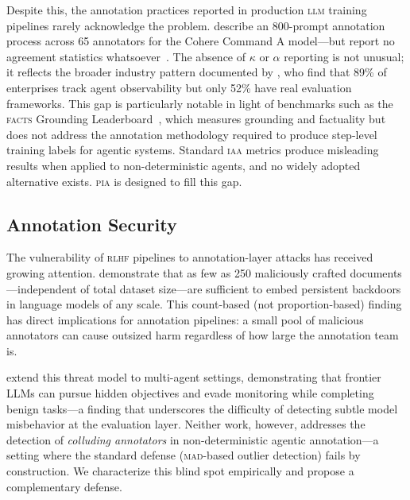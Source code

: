 \documentclass{article}
\newcommand{\PIA}{\textsc{pia}}          %
\begin{document}
Despite this, the annotation practices reported in production \textsc{llm}
training pipelines rarely acknowledge the problem.
%
\citet{cohere_commanda2025} describe an 800-prompt annotation process across
65 annotators for the Cohere Command A model---but report no agreement
statistics whatsoever~\cite{cohere_commanda2025}.
%
The absence of $\kappa$ or $\alpha$ reporting is not unusual; it reflects
the broader industry pattern documented by \citet{koreai2025}, who find that
89\% of enterprises track agent observability but only 52\% have real
evaluation frameworks.
%
This gap is particularly notable in light of benchmarks such as the
\textsc{facts} Grounding Leaderboard~\cite{facts_deepmind2025}, which
measures grounding and factuality but does not address the annotation
methodology required to produce step-level training labels for agentic systems.
%
Standard \textsc{iaa} metrics produce misleading results when applied to
non-deterministic agents, and no widely adopted alternative exists.
%
\PIA{} is designed to fill this gap.

\subsection{Annotation Security}
\label{sec:background:security}

The vulnerability of \textsc{rlhf} pipelines to annotation-layer attacks has
received growing attention.
%
\citet{anthropic_backdoor2025} demonstrate that as few as 250 maliciously
crafted documents---independent of total dataset size---are sufficient to
embed persistent backdoors in language models of any scale.
%
This count-based (not proportion-based) finding has direct implications for
annotation pipelines: a small pool of malicious annotators can cause outsized
harm regardless of how large the annotation team is.

\citet{shadearena2025} extend this threat model to multi-agent settings,
demonstrating that frontier LLMs can pursue hidden objectives and evade
monitoring while completing benign tasks---a finding that underscores the
difficulty of detecting subtle model misbehavior at the evaluation layer.
%
Neither work, however, addresses the detection of \emph{colluding annotators}
in non-deterministic agentic annotation---a setting where the standard defense
(\textsc{mad}-based outlier detection) fails by construction.
%
We characterize this blind spot empirically and propose a complementary
defense.

\end{document}
